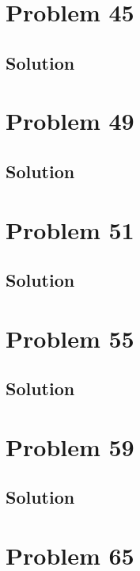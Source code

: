 \documentclass[12pt]{article}
\begin{document}
    \pagebreak
    \section{Problem 45}

        \subsection{Solution}

    \pagebreak
    \section{Problem 49}

        \subsection{Solution}

    \pagebreak
    \section{Problem 51}

        \subsection{Solution}

    \pagebreak
    \section{Problem 55}

        \subsection{Solution}

    \pagebreak
    \section{Problem 59}

        \subsection{Solution}

    \pagebreak
    \section{Problem 65}
\end{document}
